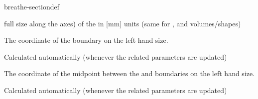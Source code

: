 \documentclass[letterpaper,10pt,english]{sphinxmanual}
\begin{document}
\begin{fulllineitems}
\begin{sphinxuseclass}{breathe-sectiondef}
\begin{fulllineitems}
\sphinxAtStartPar
full size along the  axes) of the  in {[}mm{]} units (same for ,  and  volumes/shapes) 

\end{fulllineitems}


\begin{fulllineitems}
\label{\detokenize{Simulation/SimulationCodeDoc:_CPPv4N8Geometry11fCaloStartXE}}
\pysigstartsignatures
\pysigstartmultiline
{}
\pysigstopmultiline
\pysigstopsignatures
\sphinxAtStartPar
The \sphinxhyphen{}coordinate of the  boundary on the left hand size. 

\sphinxAtStartPar
Calculated automatically (whenever the related parameters are updated) 

\end{fulllineitems}


\begin{fulllineitems}
\label{\detokenize{Simulation/SimulationCodeDoc:_CPPv4N8Geometry17fPrimaryXPositionE}}
\pysigstartsignatures
\pysigstartmultiline
{}
\pysigstopmultiline
\pysigstopsignatures
\sphinxAtStartPar
The \sphinxhyphen{}coordinate of the mid\sphinxhyphen{}point between the  and  boundaries on the left hand size. 

\sphinxAtStartPar
Calculated automatically (whenever the related parameters are updated) 

\end{fulllineitems}



\end{sphinxuseclass}
\end{fulllineitems}
\end{document}

